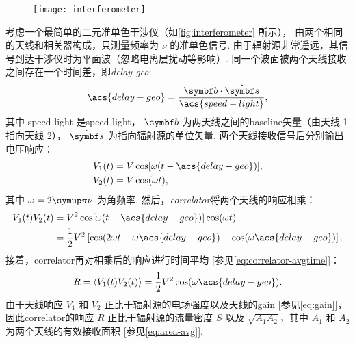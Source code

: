 \begin{figure}[htp]
  \centering
  \texttt{[image: interferometer]}
  \label{fig:interferometer}
\end{figure}

考虑一个最简单的二元准单色干涉仪（如\autoref{fig:interferometer} 所示），
由两个相同的天线和相关器构成，只测量频率为 $\nu$ 的准单色信号.
由于辐射源非常遥远，其信号到达干涉仪时为平面波（忽略电离层扰动等影响）.
同一个波面被两个天线接收之间存在一个时间差，即\emph{\acf{delay-geo}}:
\begin{equation}
  \acs{delay-geo} = \frac{\B{b} \cdot \hat{\B{s}}}{\acs{speed-light}},
\end{equation}
其中 \acs{speed-light} 是\acl{speed-light}，
$\B{b}$ 为两天线之间的\ac{baseline}矢量（由天线 1 指向天线 2），
$\hat{\B{s}}$ 为指向辐射源的单位矢量.
两个天线接收信号后分别输出电压响应：
\begin{align}
  V_1(t) &= V \cos [\omega (t - \acs{delay-geo})], \\
  V_2(t) &= V \cos (\omega t),
\end{align}
其中 $\omega = 2\Cpi\nu$ 为角频率.
然后，\emph{\acf{correlator}}将两个天线的响应相乘：
\begin{align}
  V_1(t) V_2(t)
    &= V^2 \cos [\omega (t - \acs{delay-geo})] \cos (\omega t) \\
    &= \frac{1}{2} V^2 \left[ \cos (2\omega t - \omega \acs{delay-geo})
      + \cos (\omega \acs{delay-geo}) \right].
\end{align}
接着，\ac{correlator}再对相乘后的响应进行时间平均
[参见\autoref{eq:correlator-avgtime}]：
\begin{equation}
  \label{eq:resp-corr}
  R = \langle V_1(t) V_2(t) \rangle
    = \frac{1}{2} V^2 \cos (\omega \acs{delay-geo}).
\end{equation}
由于天线响应 $V_1$ 和 $V_2$ 正比于辐射源的电场强度以及天线的\ac{gain}
[参见\autoref{eq:gain}]，
因此\ac{correlator}的响应 $R$ 正比于辐射源的流量密度 $S$
以及 $\sqrt{A_1 A_2}$，其中 $A_1$ 和 $A_2$ 为两个天线的有效接收面积
[参见\autoref{eq:area-avg}].

